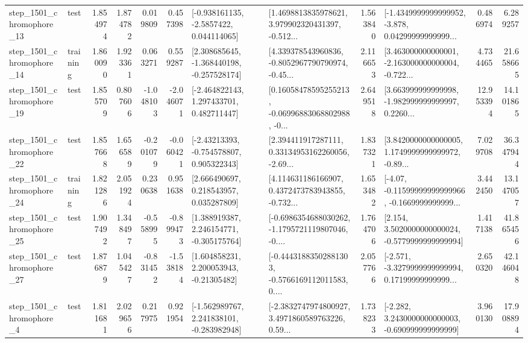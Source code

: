 \begin{tabular}{llrrrrllrlrr}
 step\_1501\_chromophore\_13 &      test &      1.854974 &    1.874782 &      0.019809 &  0.457398 &     [-0.938161135, -2.5857422, 0.044114065] &  [1.4698813835978621, 3.979902320431397, -0.512... &       1.563840 &  [-1.4349999999999952, -3.878, 0.04299999999999... &            0.486974 &          6.289257 \\
 step\_1501\_chromophore\_14 &  training &      1.860090 &    1.923361 &      0.063271 &  0.559287 &   [2.308685645, -1.368440198, -0.257528174] &  [4.339378543960836, -0.8052967790790974, -0.45... &       2.116653 &  [3.463000000000001, -2.163000000000004, -0.722... &            4.734465 &         21.658665 \\
 step\_1501\_chromophore\_19 &      test &      1.855709 &    0.807606 &     -1.048103 & -2.046071 &    [-2.464822143, 1.297433701, 0.482711447] &  [0.16058478595255213, -0.06996883068802988, -0... &       2.649518 &  [3.663999999999998, -1.982999999999997, 0.2260... &           12.953394 &         14.101865 \\
 step\_1501\_chromophore\_22 &      test &      1.857668 &    1.656589 &     -0.201079 & -0.060421 &    [-2.43213393, -0.754578807, 0.905322343] &  [2.394411917287111, 0.33134953162260056, -2.69... &       1.837321 &  [3.8420000000000005, 1.1749999999999972, -0.89... &            7.029708 &         36.347944 \\
 step\_1501\_chromophore\_24 &  training &      1.821286 &    2.051924 &      0.230638 &  0.951638 &     [2.666490697, 0.218543957, 0.035287809] &  [4.114631186166907, 0.4372473783943855, -0.732... &       1.653482 &  [-4.07, -0.11599999999999966, -0.1669999999999... &            3.442450 &         13.147057 \\
 step\_1501\_chromophore\_25 &      test &      1.907492 &    1.348497 &     -0.558995 & -0.899473 &    [1.388919387, 2.246154771, -0.305175764] &  [-0.6986354688030262, -1.1795721119807046, -0.... &       1.764706 &   [2.154, 3.5020000000000024, -0.5779999999999994] &            1.417138 &         41.865456 \\
 step\_1501\_chromophore\_27 &      test &      1.876879 &    1.045427 &     -0.831452 & -1.538184 &     [1.604858231, 2.200053943, -0.21305482] &  [-0.44431883502881303, -0.5766169112011583, 0.... &       2.057766 &  [-2.571, -3.3279999999999994, 0.17199999999999... &            2.650320 &         42.146048 \\
  step\_1501\_chromophore\_4 &      test &      1.811681 &    2.029656 &      0.217975 &  0.921954 &   [-1.562989767, 2.241838101, -0.283982948] &  [-2.3832747974800927, 3.4971860589763226, 0.59... &       1.738233 &   [-2.282, 3.2430000000000003, -0.690999999999999] &            3.960130 &         17.908894 \\

\end{tabular}
